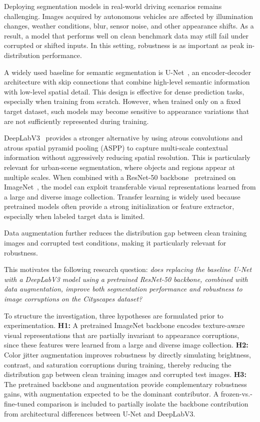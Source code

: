 \documentclass[conference]{IEEEtran}
\begin{document}
Deploying segmentation models in real-world driving scenarios remains challenging. Images acquired by autonomous vehicles are affected by illumination changes, weather conditions, blur, sensor noise, and other appearance shifts. As a result, a model that performs well on clean benchmark data may still fail under corrupted or shifted inputs. In this setting, robustness is as important as peak in-distribution performance.

A widely used baseline for semantic segmentation is U-Net~\cite{ronneberger2015unet}, an encoder-decoder architecture with skip connections that combine high-level semantic information with low-level spatial detail. This design is effective for dense prediction tasks, especially when training from scratch. However, when trained only on a fixed target dataset, such models may become sensitive to appearance variations that are not sufficiently represented during training.

DeepLabV3~\cite{chen2017deeplab} provides a stronger alternative by using atrous convolutions and atrous spatial pyramid pooling (ASPP) to capture multi-scale contextual information without aggressively reducing spatial resolution. This is particularly relevant for urban-scene segmentation, where objects and regions appear at multiple scales. When combined with a ResNet-50 backbone~\cite{he2016resnet} pretrained on ImageNet~\cite{russakovsky2015imagenet}, the model can exploit transferable visual representations learned from a large and diverse image collection. Transfer learning is widely used because pretrained models often provide a strong initialization or feature extractor, especially when labeled target data is limited.

Data augmentation further reduces the distribution gap between clean training images and corrupted test conditions, making it particularly relevant for robustness.

This motivates the following research question: \textit{does replacing the baseline U-Net with a DeepLabV3 model using a pretrained ResNet-50 backbone, combined with data augmentation, improve both segmentation performance and robustness to image corruptions on the Cityscapes dataset?}

To structure the investigation, three hypotheses are formulated prior to experimentation. \textbf{H1:} A pretrained ImageNet backbone encodes texture-aware visual representations that are partially invariant to appearance corruptions, since these features were learned from a large and diverse image collection. \textbf{H2:} Color jitter augmentation improves robustness by directly simulating brightness, contrast, and saturation corruptions during training, thereby reducing the distribution gap between clean training images and corrupted test images. \textbf{H3:} The pretrained backbone and augmentation provide complementary robustness gains, with augmentation expected to be the dominant contributor. A frozen-vs.-fine-tuned comparison is included to partially isolate the backbone contribution from architectural differences between U-Net and DeepLabV3.
\end{document}

